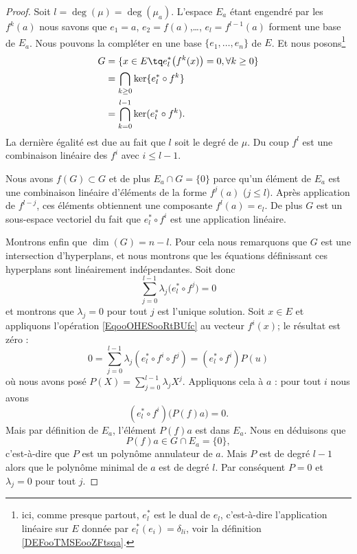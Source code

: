 \begin{proof}
	Soit \( l=\deg(\mu)=\deg(\mu_a)\). L'espace \( E_a\) étant engendré par les \( f^k(a)\) nous savons que \( e_1=a\), \( e_2=f(a)\),\ldots, \( e_l=f^{l-1}(a)\) forment une base de \( E_a\). Nous pouvons la compléter en une base \( \{ e_1,\ldots, e_n \}\) de \( E\). Et nous posons\footnote{ici, comme presque partout, \( e^*_{l}\) est le dual de \( e_l\), c'est-à-dire l'application linéaire sur \( E\) donnée par \( e^*_l(e_i)=\delta_{li}\), voir la définition \ref{DEFooTMSEooZFtsqa}.}
	\begin{subequations}
		\begin{align}
			G & = \{ x\in E\tq e^*_l\big( f^k(x) \big)=0, \forall k\geq 0 \} \\
			  & = \bigcap_{k\geq 0}\ker\{ e^*_l\circ f^k \}                  \\
			  & = \bigcap_{k=0}^{l-1}\ker( e^*_l\circ f^k ).
		\end{align}
	\end{subequations}
	La dernière égalité est due au fait que \( l\) soit le degré de \( \mu\). Du coup \( f^l\) est une combinaison linéaire des \( f^i\) avec \( i\leq l-1\).

	Nous avons \( f(G)\subset G\) et de plus \( E_a\cap G=\{ 0 \}\) parce qu'un élément de \( E_a\) est une combinaison linéaire d'éléments de la forme \( f^j(a)\) (\( j\leq l\)). Après application de \( f^{l-j}\), ces éléments obtiennent une composante \( f^l(a)=e_l\). De plus \( G\) est un sous-espace vectoriel du fait que \( e^*_l\circ f^i\) est une application linéaire.

	Montrons enfin que \( \dim(G)=n-l\). Pour cela nous remarquons que \( G\) est une intersection d'hyperplans, et nous montrons que les équations définissant ces hyperplans sont linéairement indépendantes. Soit donc
	\begin{equation}        \label{EqooOHESooRtBUfc}
		\sum_{j=0}^{l-1}\lambda_j\big( e^*_l\circ f^j \big)=0
	\end{equation}
	et montrons que \( \lambda_j=0\) pour tout \( j\) est l'unique solution. Soit \( x\in E\) et appliquons l'opération \eqref{EqooOHESooRtBUfc} au vecteur \( f^i(x)\); le résultat est zéro :
	\begin{equation}
		0=\sum_{j=0}^{l-1}\lambda_j(e^*_l\circ f^i\circ f^j)=(e^*_l\circ f^i)P(u)
	\end{equation}
	où nous avons posé \( P(X)=\sum_{j=0}^{l-1}\lambda_jX^j\). Appliquons cela à \( a\) : pour tout \( i\) nous avons
	\begin{equation}
		(e^*_l\circ f^i)\big( P(f)a \big)=0.
	\end{equation}
	Mais par définition de \( E_a\), l'élément \(P(f)a \) est dans \( E_a\). Nous en déduisons que
	\begin{equation}
		P(f)a\in G\cap E_a=\{ 0 \},
	\end{equation}
	c'est-à-dire que \( P\) est un polynôme annulateur de \( a\). Mais \( P\) est de degré \( l-1\) alors que le polynôme minimal de \( a\) est de degré \( l\). Par conséquent \( P=0\) et \( \lambda_j=0\) pour tout \( j\).
\end{proof}


